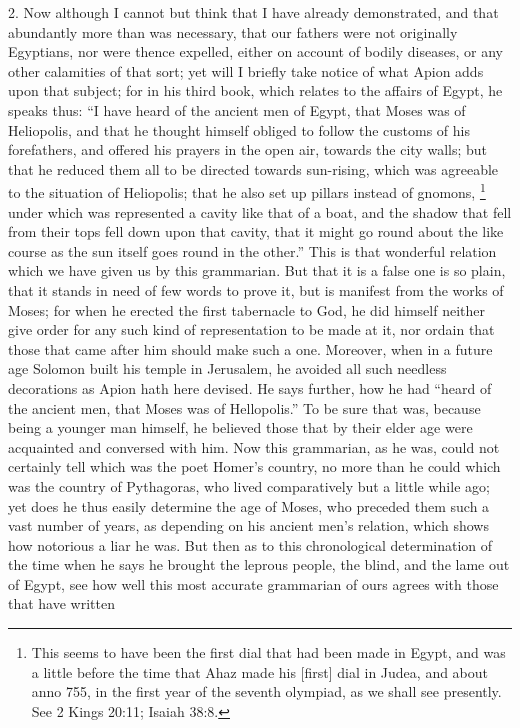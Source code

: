 2. Now although I cannot but think that I have already demonstrated, and
that abundantly more than was necessary, that our fathers were not
originally Egyptians, nor were thence expelled, either on account of
bodily diseases, or any other calamities of that sort; yet will I briefly
take notice of what Apion adds upon that subject; for in his third book,
which relates to the affairs of Egypt, he speaks thus: ``I have heard of
the ancient men of Egypt, that Moses was of Heliopolis, and that he
thought himself obliged to follow the customs of his forefathers, and
offered his prayers in the open air, towards the city walls; but that he
reduced them all to be directed towards sun-rising, which was agreeable to
the situation of Heliopolis; that he also set up pillars instead of
gnomons, \footnote{This seems to have been
the first dial that had been made in Egypt, and was a little before the
time that Ahaz made his [first] dial in Judea, and about anno 755, in the
first year of the seventh olympiad, as we shall see presently. See 2 Kings
20:11; Isaiah 38:8.}
under which was represented a cavity like that of a boat, and the shadow
that fell from their tops fell down upon that cavity, that it might go
round about the like course as the sun itself goes round in the other.''
This is that wonderful relation which we have given us by this grammarian.
But that it is a false one is so plain, that it stands in need of few
words to prove it, but is manifest from the works of Moses; for when he
erected the first tabernacle to God, he did himself neither give order for
any such kind of representation to be made at it, nor ordain that those
that came after him should make such a one. Moreover, when in a future age
Solomon built his temple in Jerusalem, he avoided all such needless
decorations as Apion hath here devised. He says further, how he had ``heard
of the ancient men, that Moses was of Hellopolis.'' To be sure that was,
because being a younger man himself, he believed those that by their elder
age were acquainted and conversed with him. Now this grammarian, as he
was, could not certainly tell which was the poet Homer's country, no more
than he could which was the country of Pythagoras, who lived comparatively
but a little while ago; yet does he thus easily determine the age of
Moses, who preceded them such a vast number of years, as depending on his
ancient men's relation, which shows how notorious a liar he was. But then
as to this chronological determination of the time when he says he brought
the leprous people, the blind, and the lame out of Egypt, see how well
this most accurate grammarian of ours agrees with those that have written
